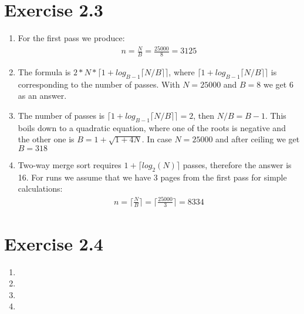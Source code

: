 \documentclass[10pt]{article}
\begin{document}
  \section*{Exercise 2.3}
   \begin{enumerate}[label=\arabic*.]
      \item
      	For the first pass we produce:
        \begin{align}
          n = \frac{N}{B} = \frac{25000}{8} = 3125
        \end{align}
      \item
        The formula is $2*N*\lceil 1+log_{B-1} \lceil N/B \rceil \rceil$, where
        $\lceil 1+log_{B-1} \lceil N/B \rceil \rceil$ is corresponding to the number
        of passes. With $N = 25000$ and $B = 8$ we get $6$ as an answer.
      \item
      	The number of passes is $\lceil 1+log_{B-1} \lceil N/B \rceil \rceil = 2$,
        then $N/B = B-1$. This boils down to a quadratic equation, where one of the
        roots is negative and the other one is $B = 1+\sqrt{1+4N}$. In case $N = 25000$
        and after ceiling we get $B = 318$
      \item
        Two-way merge sort requires $1 + \lceil log_2(N) \rceil$ passes, therefore
        the answer is 16. For runs we assume that we have 3 pages from the first pass
        for simple calculations:
        \begin{align}
          n = \lceil \frac{N}{B} \rceil = \lceil \frac{25000}{3} \rceil = 8334
        \end{align}
  \end{enumerate}

  \section*{Exercise 2.4}
   \begin{enumerate}[label=\arabic*.]
      \item

      \item

      \item

      \item

  \end{enumerate}
\end{document}
